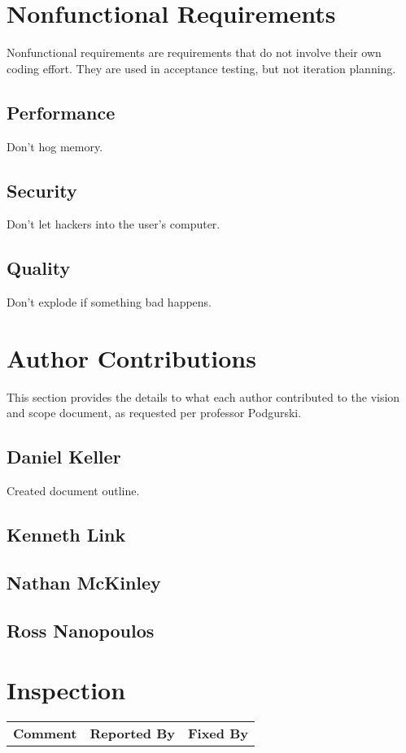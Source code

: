 \documentclass[letter]{scrartcl}
\begin{document}
\section{Nonfunctional Requirements}
Nonfunctional requirements are requirements that do not involve their own coding effort. They are used in acceptance testing, but not iteration planning. 
\subsection{Performance}
Don\rq{}t hog memory.
\subsection{Security}
Don\rq{}t let hackers into the user\rq{}s computer.
\subsection{Quality}
Don\rq{}t explode if something bad happens.

\pagebreak
\section{Author Contributions}
This section provides the details to what each author contributed to the vision and scope document, as requested per professor Podgurski.
\subsection{Daniel Keller}
Created document outline.
\subsection{Kenneth Link}
\subsection{Nathan McKinley}
\subsection{Ross Nanopoulos}

\section{Inspection}
\begin{tabularx}{\textwidth}{X c c}
\textbf{Comment} & \textbf{Reported By} & \textbf{Fixed By} \\
\end{tabularx}
\end{document}
